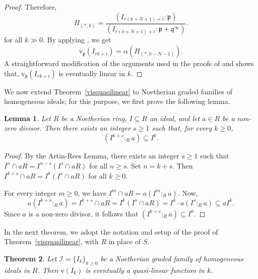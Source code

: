 \documentclass[11pt,reqno,a4paper]{amsart}
\newtheorem{theorem}{Theorem}[section]
\newtheorem{lemma}[theorem]{Lemma}
\theoremstyle{definition}
\begin{document}
\begin{proof}
\noindent Therefore,
\[
H_{(*,k)} = \frac{(I_{r(k+N+1)+i} : \mathfrak{p})}{(I_{r(k+N+1)+i} : \mathfrak{p} + \mathfrak{q}^{\infty}) }.
\]
 for all \(k \gg 0\). By applying \cite[Lemma 1.2]{Conca24} , we get
\[
\mathrm{v}_{\mathfrak{p}}(I_{rk+i}) = \alpha(H_{(*,k-N-1)}).
\]
A straightforward modification of the arguments used in the proofs of
\cite[Lemma 3.3]{BrunsConcaVarbaro} and \cite[Theorem 8.3.4]{BrunsConcaRaicuVarbaro2022} shows that, $\mathrm{v}_{\mathfrak{p}}(I_{rk + i})$
is eventually linear in \(k\).



\end{proof}



\noindent We now extend Theorem~\ref{visquasilinear} to Noetherian graded families of homogeneous ideals; for this purpose, we first prove the following lemma.


\begin{lemma}\label{ArtinReeslemma}
Let $R$ be a Noetherian ring, $I\subseteq R$ an ideal, and let $a\in R$ be a non-zero divisor. Then there exists an integer $s\ge 1$ such that, for every $k\ge 0$,
\[
(I^{k+s}:_R a)\subseteq I^k.
\]
\end{lemma}

\begin{proof}
By the Artin-Rees Lemma, there exists an integer $s\ge 1$ such that
\(
I^n\cap aR = I^{n-s}(I^s\cap aR)
\)
for all $n\ge s$. Set $n=k+s$. Then
\(
I^{k+s}\cap aR = I^k(I^s\cap aR)
\)
for all $k\ge 0$.

\noindent For every integer $m\ge 0$, we have
\(
I^m\cap aR = a(I^m:_R a).
\)
Now,
\[
a(I^{k+s}:_R a) = I^{k+s}\cap aR = I^k(I^s\cap aR) = I^k\cdot a(I^s:_R a) \subseteq aI^k.
\]
Since $a$ is a non-zero divisor, it follows that
\(
(I^{k+s}:_R a)\subseteq I^k.
\)
\end{proof}


\noindent In the next theorem, we adopt the notation and setup of the proof of Theorem~\ref{visquasilinear}, with \(R\) in place of \(S\).






\begin{theorem}\label{vnumberisquasilinearforhomogeneous}
Let \(\mathcal{I} = \{I_k\}_{k \geq 0}\) be a Noetherian graded family of homogeneous ideals in  \(R\). Then \(\mathrm{v}(I_k)\) is eventually a quasi-linear function in \(k\). 
\end{theorem}
\end{document}
